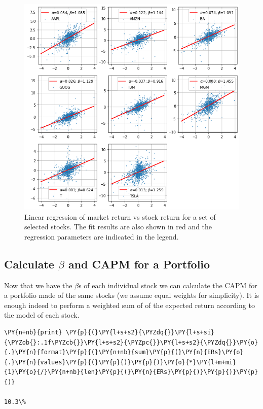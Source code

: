 \begin{figure}[htb]
	\centering
	\includegraphics[width=.8\textwidth]{figures/capm_fit.png}
	\caption{Linear regression of market return vs stock return for a set of selected stocks. The fit results are also shown in red and the regression parameters are indicated in the legend.}
	\label{fig:capm_fit}
\end{figure}

\subsection{Calculate $\beta$ and CAPM for a Portfolio}

Now that we have the $\beta$s of each individual stock we can calculate the CAPM for a portfolio made of the same stocks (we assume equal weights for simplicity).
It is enough indeed to perform a weighted sum of of the expected return according to the model of each stock.

\begin{tcolorbox}[breakable, size=fbox, boxrule=1pt, pad at break*=1mm,colback=cellbackground, colframe=cellborder]
\begin{Verbatim}[commandchars=\\\{\}]
\PY{n+nb}{print} \PY{p}{(}\PY{l+s+s2}{\PYZdq{}}\PY{l+s+si}{\PYZob{}:.1f\PYZcb{}}\PY{l+s+s2}{\PYZpc{}}\PY{l+s+s2}{\PYZdq{}}\PY{o}{.}\PY{n}{format}\PY{p}{(}\PY{n+nb}{sum}\PY{p}{(}\PY{n}{ERs}\PY{o}{.}\PY{n}{values}\PY{p}{(}\PY{p}{)}\PY{p}{)}\PY{o}{*}\PY{l+m+mi}{1}\PY{o}{/}\PY{n+nb}{len}\PY{p}{(}\PY{n}{ERs}\PY{p}{)}\PY{p}{)}\PY{p}{)}

10.3\%
\end{Verbatim}
\end{tcolorbox}

